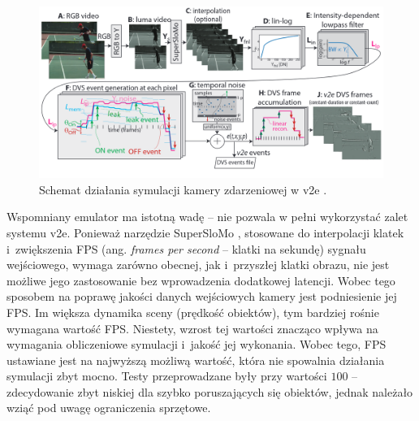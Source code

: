\begin{figure}
    \centering
    \includegraphics[width=0.85\linewidth]{images/v2e_overview.png}
    \caption{Schemat działania symulacji kamery zdarzeniowej w v2e \cite{v2e}.}
    \label{fig:v2e}
\end{figure}

Wspomniany emulator ma istotną wadę -- nie pozwala w pełni wykorzystać zalet systemu v2e. Ponieważ narzędzie SuperSloMo \cite{SuperSloMo}, stosowane do interpolacji klatek i~zwiększenia FPS (ang. \textit{frames per second} -- klatki na sekundę) sygnału wejściowego, wymaga zarówno obecnej, jak i~przyszłej klatki obrazu, nie jest możliwe jego zastosowanie bez wprowadzenia dodatkowej latencji.
Wobec tego sposobem na poprawę jakości danych wejściowych kamery jest podniesienie jej FPS. Im większa dynamika sceny (prędkość obiektów), tym bardziej rośnie wymagana wartość FPS. Niestety, wzrost tej wartości znacząco wpływa na wymagania obliczeniowe symulacji i~jakość jej wykonania. Wobec tego, FPS ustawiane jest na najwyższą możliwą wartość, która nie spowalnia działania symulacji zbyt mocno. Testy przeprowadzane były przy wartości $100$ -- zdecydowanie zbyt niskiej dla szybko poruszających się obiektów, jednak należało wziąć pod uwagę ograniczenia sprzętowe.



\vspace{11px}



